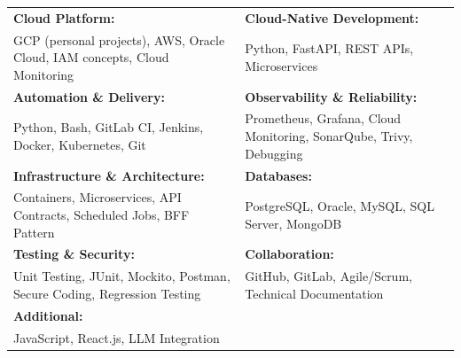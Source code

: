 \renewcommand{\arraystretch}{1.2}

\begin{tabular}{p{} p{}}
    \textbf{Cloud Platform:} & \textbf{Cloud-Native Development:} \\
    GCP (personal projects), AWS, Oracle Cloud, IAM concepts, Cloud Monitoring & Python, FastAPI, REST APIs, Microservices \\
    
    \textbf{Automation \& Delivery:} & \textbf{Observability \& Reliability:} \\
    Python, Bash, GitLab CI, Jenkins, Docker, Kubernetes, Git & Prometheus, Grafana, Cloud Monitoring, SonarQube, Trivy, Debugging \\
    
    \textbf{Infrastructure \& Architecture:} & \textbf{Databases:} \\
    Containers, Microservices, API Contracts, Scheduled Jobs, BFF Pattern & PostgreSQL, Oracle, MySQL, SQL Server, MongoDB \\
    
    \textbf{Testing \& Security:} & \textbf{Collaboration:} \\
    Unit Testing, JUnit, Mockito, Postman, Secure Coding, Regression Testing & GitHub, GitLab, Agile/Scrum, Technical Documentation \\
    
    \textbf{Additional:} & \\
    JavaScript, React.js, LLM Integration & \\

\end{tabular}
